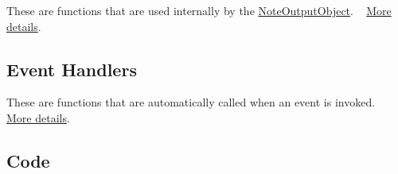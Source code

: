 These are functions that are used internally by the \hyperlink{class_note_output_object}{Note\+Output\+Object}. ~\newline
 \hyperlink{group___n_o_o_priv_func}{More details}.\hypertarget{group___doc_n_o_o_DocNOOHandlers}{}\subsection{Event Handlers}\label{group___doc_n_o_o_DocNOOHandlers}
These are functions that are automatically called when an event is invoked. ~\newline
 \hyperlink{group___n_o_o_handlers}{More details}.\hypertarget{group___doc_n_o_o_DocNOOCode}{}\subsection{Code}\label{group___doc_n_o_o_DocNOOCode}

